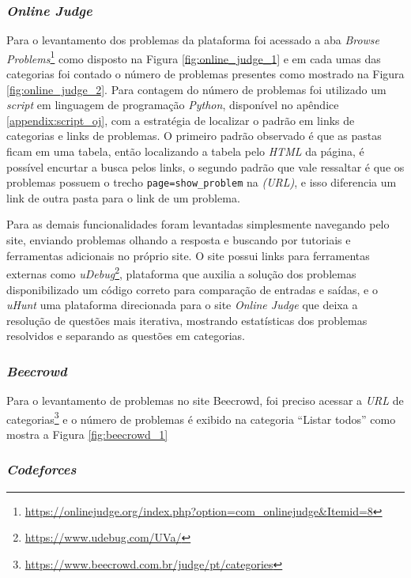 \subsubsection{\textit{Online Judge}}
\label{subsubsec:met_online_judge}

Para o levantamento dos problemas da plataforma foi acessado a aba \textit{Browse Problems}\footnote{\url{https://onlinejudge.org/index.php?option=com\_onlinejudge\&Itemid=8}} como disposto na Figura \ref{fig:online_judge_1} e em cada umas das categorias foi contado o número de problemas presentes como mostrado na Figura \ref{fig:online_judge_2}. Para contagem do número de problemas foi utilizado um \textit{script} em linguagem de programação \textit{Python}, disponível no apêndice \ref{appendix:script_oj}, com a estratégia de localizar o padrão em links de categorias e links de problemas. O primeiro padrão observado é que as pastas ficam em uma tabela, então localizando a tabela pelo \textit{HTML} da página, é possível encurtar a busca pelos links, o segundo padrão que vale ressaltar é que os problemas possuem o trecho \texttt{page=show\_problem} na \textit{(URL)}, e isso diferencia um link de outra pasta para o link de um problema.

Para as demais funcionalidades foram levantadas simplesmente navegando pelo site, enviando problemas olhando a resposta e buscando por tutoriais e ferramentas adicionais no próprio site. O site possui links para ferramentas externas como \textit{uDebug}\footnote{\url{https://www.udebug.com/UVa/}}, plataforma que auxilia a solução dos problemas disponibilizado um código correto para comparação de entradas e saídas, e o \textit{uHunt} uma plataforma direcionada para o site \textit{Online Judge} que deixa a resolução de questões mais iterativa, mostrando estatísticas dos problemas resolvidos e separando as questões em categorias. 



\subsubsection{\textit{Beecrowd}}
\label{subsubsec:met_beecrowd}
Para o levantamento de problemas no site Beecrowd, foi preciso acessar a \textit{URL} de categorias\footnote{\url{https://www.beecrowd.com.br/judge/pt/categories}} e o número de problemas é exibido na categoria “Listar todos” como mostra a Figura \ref{fig:beecrowd_1}


\subsubsection{\textit{Codeforces}}
\label{subsubsec:met_codeforces}

